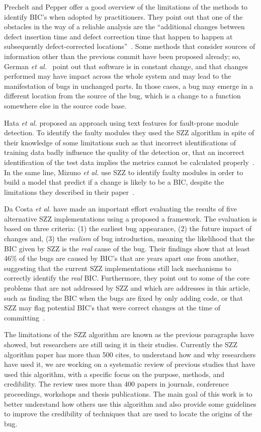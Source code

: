 \documentclass[10pt, conference]{IEEEtran}
\begin{document}
Prechelt and Pepper offer a good overview of the limitations of the methods to identify BIC's when adopted by practitioners. They point out that one of the obstacles in the way of a reliable analysis are the ``additional changes between defect insertion time and defect correction time that happen to happen at subsequently defect-corrected locations''~\cite{prechelt2014software}. Some methods that consider sources of information other than the previous commit have been proposed already; so, German \emph{et al.}~\cite{german2009change} 
point out that software is in constant change, and that changes performed may have impact across the whole system and may lead to the manifestation of bugs in unchanged parts. In those cases, a bug may emerge in a different location from the source of the bug, which is a change to a function somewhere else in the source code base. 

Hata \emph{et al.} proposed an approach using text features for fault-prone module detection. To identify the faulty modules they used the SZZ algorithm in spite of their knowledge of some limitations such as that incorrect identifications of training data badly influence the quality of the detection or, that an incorrect identification of the test data implies the metrics cannot be calculated properly~\cite{hata2010fault}. In the same line, Mizuno \emph{et al.} use SZZ to identify faulty modules in order to build a model that predict if a change is likely to be a BIC, despite the limitations they described in their paper~\cite{mizuno2010prediction}.

Da Costa \emph{et al.} have made an important effort evaluating the results of five alternative SZZ implementations using a proposed a framework. The evaluation is based on three criteria: (1) the earliest bug appearance, (2) the future impact of changes and, (3) the \emph{realism} of bug introduction, meaning the likelihood that the BIC given by SZZ is the \emph{real} cause of the bug. Their findings show that at least 46\% of the bugs are caused by BIC's that are years apart one from another, suggesting that the current SZZ implementations still lack mechanisms to correctly identify the \emph{real} BIC. Furthermore, they point out to some of the core problems that are not addressed by SZZ and which are addresses in this article, such as finding the BIC when the bugs are fixed by only adding code, or that SZZ may flag potential BIC's that were correct changes at the time of committing~\cite{da2016framework}.

The limitations of the SZZ algorithm are known as the previous paragraphs have showed, but researchers are still using it in their studies. Currently the SZZ algorithm paper has more than 500 cites, to understand how and why researchers have used it, we are working on a systematic review of previous studies that have used this algorithm, with a specific focus on the purpose, methods, and credibility. The review uses more than 400 papers in journals, conference proceedings, workshops and thesis publications. The main goal of this work is to better understand how others use this algorithm and also provide some guidelines to improve the credibility of techniques that are used to locate the origins of the bug.
\end{document}
